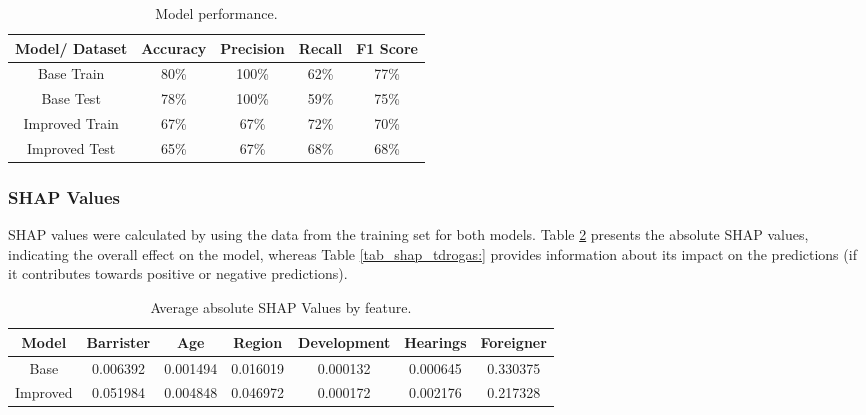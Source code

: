 \documentclass[twoside,11pt]{article}
\begin{document}

\begin{table}[!htb]
\centering
\begin{tabular}{|c|c|c|c|c|}
\hline

\textbf{Model/ Dataset} & \textbf{Accuracy} & \textbf{Precision} & \textbf{Recall} & \textbf{F1 Score} \\ \hline
     Base Train &     80\% &     100\% &   62\% &     77\% \\
      Base Test &     78\% &     100\% &   59\% &     75\% \\
Improved Train &     67\% &      67\% &   72\% &     70\% \\
 Improved Test &     65\% &      67\% &   68\% &     68\% \\

\hline
\end{tabular}
\caption{Model performance.}
\label{tab_perf_tdrogas:}
\end{table}



\subsubsection{SHAP Values}

SHAP values were calculated by using the data from the training set for both models. Table \ref{tab_shap_abs_tdrogas:} presents the absolute SHAP values, indicating the overall effect on the model, whereas Table \ref{tab_shap_tdrogas:} provides information about its impact on the predictions (if it contributes towards positive or negative predictions).

\begin{table}[!htb]
\centering
\begin{tabular}{|c|c|c|c|c|c|c|}
\hline
    \textbf{Model} & \textbf{Barrister} &   \textbf{Age} &   \textbf{Region} &  \textbf{Development} &  \textbf{Hearings} &  \textbf{Foreigner} \\ \hline
     Base &   0.006392 & 0.001494 & 0.016019 &     0.000132 &  0.000645 &   0.330375 \\ 
Improved &   0.051984 & 0.004848 & 0.046972 &     0.000172 &  0.002176 &   0.217328 \\ 

\hline
\end{tabular}
\caption{Average absolute SHAP Values by feature.}
\label{tab_shap_abs_tdrogas:}
\end{table}
\end{document}
